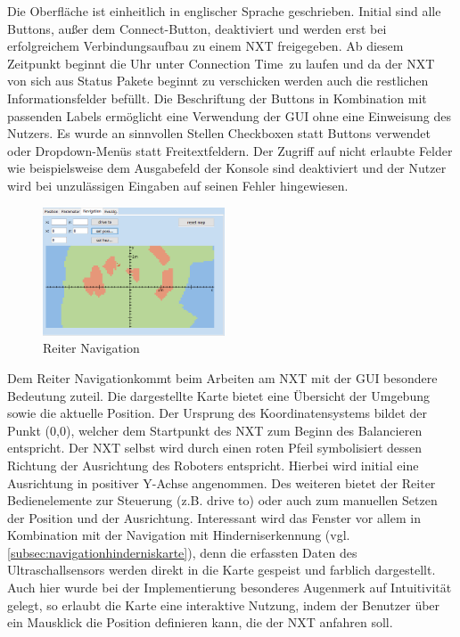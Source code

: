 \documentclass[oneside,abstractoff,a4paper]{scrartcl}
\begin{document}
Die Oberfläche ist einheitlich in englischer Sprache geschrieben. Initial sind alle Buttons, außer dem \dq Connect\dq-Button, deaktiviert und werden erst bei erfolgreichem Verbindungsaufbau zu einem NXT freigegeben. Ab diesem Zeitpunkt beginnt die Uhr unter \dq Connection Time\dq\ zu laufen und da der NXT von sich aus Status Pakete beginnt zu verschicken werden auch die restlichen Informationsfelder befüllt. Die Beschriftung der Buttons in Kombination mit passenden Labels ermöglicht eine Verwendung der GUI ohne eine Einweisung des Nutzers. Es wurde an sinnvollen Stellen Checkboxen statt Buttons verwendet oder Dropdown-Menüs statt Freitextfeldern. Der Zugriff auf nicht erlaubte Felder wie beispielsweise dem Ausgabefeld der Konsole sind deaktiviert und der Nutzer wird bei unzulässigen Eingaben auf seinen Fehler hingewiesen.
\begin{figure}
  \begin{center}
    \includegraphics[width=0.48\textwidth]{navi_map.jpg}
  \end{center}
  \caption{Reiter Navigation}
\end{figure}
Dem Reiter \dq Navigation\dq kommt beim Arbeiten am NXT mit der GUI besondere Bedeutung zuteil. Die dargestellte Karte bietet eine Übersicht der Umgebung sowie die aktuelle Position. Der Ursprung des Koordinatensystems bildet der Punkt (0,0), welcher dem Startpunkt des NXT zum Beginn des Balancieren entspricht. Der NXT selbst wird durch einen roten Pfeil symbolisiert dessen Richtung der Ausrichtung des Roboters entspricht. Hierbei wird initial eine Ausrichtung in positiver Y-Achse angenommen. Des weiteren bietet der Reiter Bedienelemente zur Steuerung (z.B. drive to) oder auch zum manuellen Setzen der Position und der Ausrichtung. Interessant wird das Fenster vor allem in Kombination mit der Navigation mit Hinderniserkennung (vgl. \cref{subsec:navigationhinderniskarte}),
denn die erfassten Daten des Ultraschallsensors werden direkt in die Karte gespeist und farblich dargestellt. Auch hier wurde bei der Implementierung besonderes Augenmerk auf Intuitivität gelegt, so erlaubt die Karte eine interaktive Nutzung, indem der Benutzer über ein Mausklick die Position definieren kann, die der NXT anfahren soll.
\end{document}
